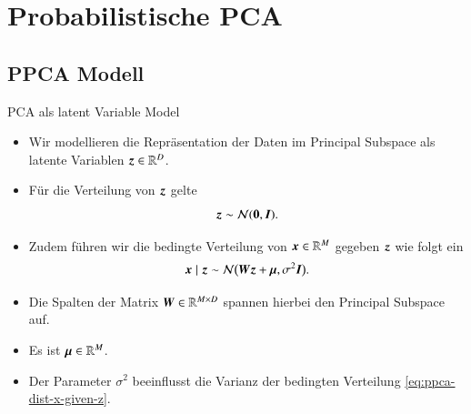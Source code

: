 \section{Probabilistische PCA}

\divider

\subsection{PPCA Modell}

\begin{frame}{PCA als latent Variable Model}{}
	\begin{itemize}
		\item Wir modellieren die Repräsentation der Daten im Principal Subspace als latente Variablen $\bm{z} \in \mathbb{R}^D$.
		\item Für die Verteilung von $\bm{z}$ gelte
		\begin{equation} \label{eq:ppca-dist-z}
			\bm{z} \sim \mathcal{N}(\bm{0}, \bm{I}).
		\end{equation}
		\item Zudem führen wir die bedingte Verteilung von $\bm{x} \in \mathbb{R}^M$ gegeben $\bm{z}$ wie folgt ein
		\begin{equation} \label{eq:ppca-dist-x-given-z}
			\bm{x} \mid \bm{z} \sim \mathcal{N}\bigl( \bm{W} \bm{z} + \bm{\mu}, \sigma^2 \bm{I} \bigr).
		\end{equation}
		\item Die Spalten der Matrix $\bm{W} \in \mathbb{R}^{M \times D}$ spannen hierbei den Principal Subspace auf.
		\item Es ist $\bm{\mu} \in \mathbb{R}^M$.
		\item Der Parameter $\sigma^2$ beeinflusst die Varianz der bedingten Verteilung \eqref{eq:ppca-dist-x-given-z}.
	\end{itemize}
\end{frame}


